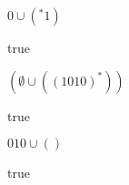 \nextq
$0 \cup ({}^*1)$
\\
\ANSWER
\begin{answerlong}
true
\end{answerlong}

\nextq
$(\emptyset \cup ((1010)^*))$
\\
\ANSWER
\begin{answerlong}
true
\end{answerlong}

\nextq
$010 \cup ()$
\\
\ANSWER
\begin{answerlong}
true
\end{answerlong}

\newpage


